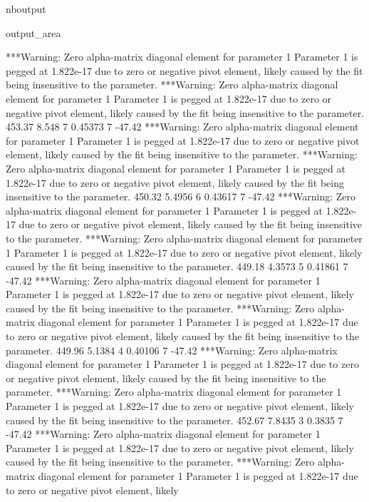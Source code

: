 \documentclass[letterpaper,10pt,english]{sphinxmanual}
\begin{document}
\begin{sphinxuseclass}{nboutput}
{\begin{sphinxuseclass}{output_area}
\begin{sphinxuseclass}{}
\begin{sphinxVerbatim}[commandchars=\\\{\}]
***Warning: Zero alpha-matrix diagonal element for parameter 1
 Parameter 1 is pegged at 1.822e-17 due to zero or negative pivot element, likely
 caused by the fit being insensitive to the parameter.
***Warning: Zero alpha-matrix diagonal element for parameter 1
 Parameter 1 is pegged at 1.822e-17 due to zero or negative pivot element, likely
 caused by the fit being insensitive to the parameter.
          453.37       8.548    7     0.45373    7      -47.42
***Warning: Zero alpha-matrix diagonal element for parameter 1
 Parameter 1 is pegged at 1.822e-17 due to zero or negative pivot element, likely
 caused by the fit being insensitive to the parameter.
***Warning: Zero alpha-matrix diagonal element for parameter 1
 Parameter 1 is pegged at 1.822e-17 due to zero or negative pivot element, likely
 caused by the fit being insensitive to the parameter.
          450.32      5.4956    6     0.43617    7      -47.42
***Warning: Zero alpha-matrix diagonal element for parameter 1
 Parameter 1 is pegged at 1.822e-17 due to zero or negative pivot element, likely
 caused by the fit being insensitive to the parameter.
***Warning: Zero alpha-matrix diagonal element for parameter 1
 Parameter 1 is pegged at 1.822e-17 due to zero or negative pivot element, likely
 caused by the fit being insensitive to the parameter.
          449.18      4.3573    5     0.41861    7      -47.42
***Warning: Zero alpha-matrix diagonal element for parameter 1
 Parameter 1 is pegged at 1.822e-17 due to zero or negative pivot element, likely
 caused by the fit being insensitive to the parameter.
***Warning: Zero alpha-matrix diagonal element for parameter 1
 Parameter 1 is pegged at 1.822e-17 due to zero or negative pivot element, likely
 caused by the fit being insensitive to the parameter.
          449.96      5.1384    4     0.40106    7      -47.42
***Warning: Zero alpha-matrix diagonal element for parameter 1
 Parameter 1 is pegged at 1.822e-17 due to zero or negative pivot element, likely
 caused by the fit being insensitive to the parameter.
***Warning: Zero alpha-matrix diagonal element for parameter 1
 Parameter 1 is pegged at 1.822e-17 due to zero or negative pivot element, likely
 caused by the fit being insensitive to the parameter.
          452.67      7.8435    3      0.3835    7      -47.42
***Warning: Zero alpha-matrix diagonal element for parameter 1
 Parameter 1 is pegged at 1.822e-17 due to zero or negative pivot element, likely
 caused by the fit being insensitive to the parameter.
***Warning: Zero alpha-matrix diagonal element for parameter 1
 Parameter 1 is pegged at 1.822e-17 due to zero or negative pivot element, likely

\end{sphinxVerbatim}
\end{sphinxuseclass}
\end{sphinxuseclass}}
\end{sphinxuseclass}
\end{document}
